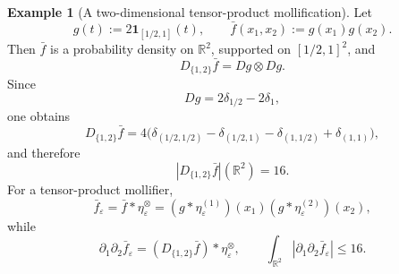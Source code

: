 \documentclass[11pt,letterpaper]{article}
\theoremstyle{definition}
\newtheorem{example}[theorem]{Example}
\theoremstyle{remark}
\begin{document}
\begin{example}[A two-dimensional tensor-product mollification]
\label{ex:appendix_tensor_product_mollification}
Let
$$
g(t):=2\mathbf 1_{[1/2,1]}(t),
\qquad
\bar f(x_1,x_2):=g(x_1)g(x_2).
$$
Then $\bar f$ is a probability density on $\mathbb R^2$, supported on
$[1/2,1]^2$, and
$$
D_{\{1,2\}}\bar f=Dg\otimes Dg.
$$
Since
$$
Dg=2\delta_{1/2}-2\delta_1,
$$
one obtains
$$
D_{\{1,2\}}\bar f
=
4\bigl(
\delta_{(1/2,1/2)}
-
\delta_{(1/2,1)}
-
\delta_{(1,1/2)}
+
\delta_{(1,1)}
\bigr),
$$
and therefore
$$
|D_{\{1,2\}}\bar f|(\mathbb R^2)=16.
$$
For a tensor-product mollifier,
$$
\bar f_\varepsilon
=
\bar f*\eta_\varepsilon^\otimes
=
(g*\eta_\varepsilon^{(1)})(x_1)
(g*\eta_\varepsilon^{(2)})(x_2),
$$
while
$$
\partial_1\partial_2\bar f_\varepsilon
=
(D_{\{1,2\}}\bar f)*\eta_\varepsilon^\otimes,
\qquad
\int_{\mathbb R^2}
|\partial_1\partial_2\bar f_\varepsilon|
\le16.
$$
\end{example}
\end{document}
